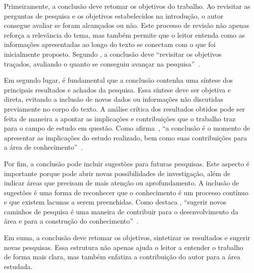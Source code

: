 \documentclass[
    12pt
    ,oneside
    ,a4paper
    ,chapter=TITLE
    ,section=TITLE
    ,sumario=abnt-6027-2012]{abntex2}
\begin{document}
Primeiramente, a conclusão deve retomar os objetivos do trabalho. Ao revisitar as perguntas de pesquisa e os objetivos estabelecidos na introdução, o autor consegue avaliar se foram alcançados ou não. Este processo de revisão não apenas reforça a relevância do tema, mas também permite que o leitor entenda como as informações apresentadas ao longo do texto se conectam com o que foi inicialmente proposto. Segundo , a conclusão deve ``revisitar os objetivos traçados, avaliando o quanto se conseguiu avançar na pesquisa''~\cite{gil}.

Em segundo lugar, é fundamental que a conclusão contenha uma síntese dos principais resultados e achados da pesquisa. Essa síntese deve ser objetiva e direta, evitando a inclusão de novos dados ou informações não discutidas previamente no corpo do texto. A análise crítica dos resultados obtidos pode ser feita de maneira a apontar as implicações e contribuições que o trabalho traz para o campo de estudo em questão. Como afirma~, ``a conclusão é o momento de apresentar as implicações do estudo realizado, bem como suas contribuições para a área de conhecimento''~\cite{lakatos}.

Por fim, a conclusão pode incluir sugestões para futuras pesquisas. Este aspecto é importante porque pode abrir novas possibilidades de investigação, além de indicar áreas que precisam de mais atenção ou aprofundamento. A inclusão de sugestões é uma forma de reconhecer que o conhecimento é um processo contínuo e que existem lacunas a serem preenchidas. Como destaca , ``sugerir novos caminhos de pesquisa é uma maneira de contribuir para o desenvolvimento da área e para a construção do conhecimento''~\cite{lakatos}.

Em suma, a conclusão deve retomar os objetivos, sintetizar os resultados e sugerir novas pesquisas. Essa estrutura não apenas ajuda o leitor a entender o trabalho de forma mais clara, mas também enfatiza a contribuição do autor para a área estudada.






\end{document}

